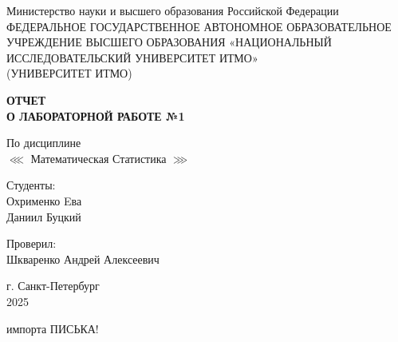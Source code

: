 \documentclass[14pt]{extreport}
\begin{document}
\begin{titlepage}
    \centering
    \vspace*{1cm}

    {\large Министерство науки и высшего образования Российской Федерации}\\
    {\large ФЕДЕРАЛЬНОЕ ГОСУДАРСТВЕННОЕ АВТОНОМНОЕ ОБРАЗОВАТЕЛЬНОЕ УЧРЕЖДЕНИЕ ВЫСШЕГО ОБРАЗОВАНИЯ «НАЦИОНАЛЬНЫЙ ИССЛЕДОВАТЕЛЬСКИЙ УНИВЕРСИТЕТ ИТМО»}\\
    {\large (УНИВЕРСИТЕТ ИТМО)}\\

    \vspace{1cm}

    \textbf{{\Huge ОТЧЕТ}\\
    {\Huge О ЛАБОРАТОРНОЙ РАБОТЕ №1}}\\

    \vspace{1cm}

    {\LARGE По дисциплине\\
     \(\lll\) Математическая Статистика \(\ggg\) }\\

    \vspace{2cm}

    {\Large Студенты:}\\
    Охрименко Eва\\
    Даниил Буцкий


    \vspace{2cm}

    {\Large Проверил:}\\
    Шкваренко Андрей Алексеевич\\

    \vspace{2cm}

    {\large г. Санкт-Петербург}\\
    {\large 2025}

\end{titlepage}
\newpage
\tableofcontents
\newpage
импорта
ПИСЬКА!
\end{document}
